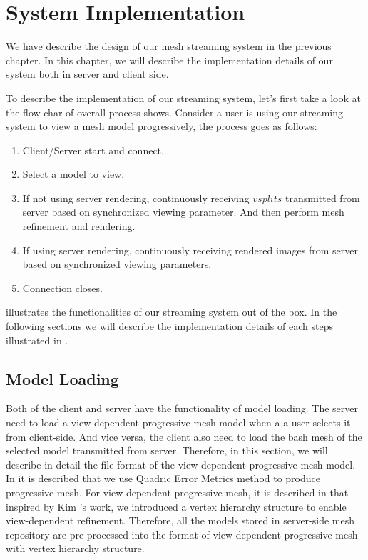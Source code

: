 \chapter{System Implementation}
\label{chapter:SystemImplementation}
We have describe the design of our mesh streaming system in the previous chapter. In this chapter, we will describe the implementation details of our system both in server and client side. 

To describe the implementation of our streaming system, let's first take a look at the flow char of overall process  shows. Consider a user is using our streaming system to view a mesh model progressively, the process goes as follows: 
\begin{enumerate}
\item
Client/Server start and connect. 
\item
Select a model to view.
\item
If not using server rendering, continuously receiving $vsplits$ transmitted from server based on synchronized viewing parameter. And then perform mesh refinement and rendering.
\item
If using server rendering, continuously receiving rendered images from server based on synchronized viewing parameters.
\item
Connection closes.
\end{enumerate}
 illustrates the functionalities of our streaming system out of the box. In the following sections we will describe the implementation details of each steps illustrated in . 

\section{Model Loading}
\label{section:modelloading}
Both of the client and server have the functionality of model loading. The server need to load a view-dependent progressive mesh model when a a user selects it from client-side. And vice versa, the client also need to load the bash mesh of the selected model transmitted from server. Therefore, in this section, we will describe in detail the file format of the view-dependent progressive mesh model. \\


In  it is described that we use Quadric Error Metrics method to produce progressive mesh. For view-dependent progressive mesh, it is described in  that inspired by Kim \etal's\cite{Kim:2003:TransitiveMeshSpace} work, we introduced a vertex hierarchy structure to enable view-dependent refinement. Therefore, all the models stored in server-side mesh repository are pre-processed into the format of view-dependent progressive mesh with vertex hierarchy structure. \\


